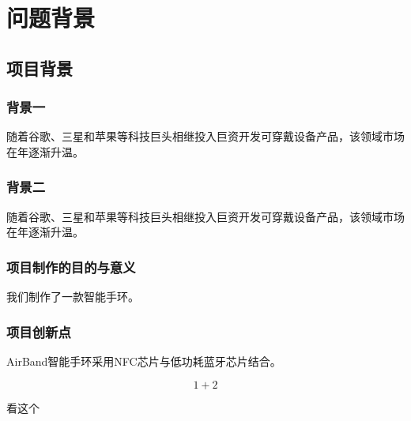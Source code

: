 \chapter{问题背景}
\section{项目背景}
\subsection{背景一}
随着谷歌、三星和苹果等科技巨头相继投入巨资开发可穿戴设备产品，该领域市场在年逐渐升温\cite{wu2013online}。


\subsection{背景二}
随着谷歌、三星和苹果等科技巨头相继投入巨资开发可穿戴设备产品，该领域市场在年逐渐升温。 

\subsection{项目制作的目的与意义}
我们制作了一款智能手环。

\subsection{项目创新点}
AirBand智能手环采用NFC芯片与低功耗蓝牙芯片结合。

\begin{equation}
    1+2
    \label{alg:abc}
\end{equation}

看这个